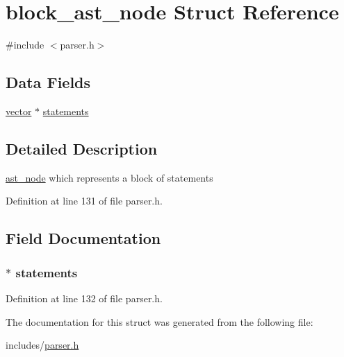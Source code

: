 \hypertarget{structblock__ast__node}{\section{block\+\_\+ast\+\_\+node Struct Reference}
\label{structblock__ast__node}
}


{\ttfamily \#include $<$parser.\+h$>$}

\subsection*{Data Fields}
\begin{DoxyCompactItemize}
\item 
\hyperlink{structvector}{vector} $\ast$ \hyperlink{structblock__ast__node_aa5ede4d66d6c38056a1f1474cef5c482}{statements}
\end{DoxyCompactItemize}


\subsection{Detailed Description}
\hyperlink{structast__node}{ast\+\_\+node} which represents a block of statements 

Definition at line 131 of file parser.\+h.



\subsection{Field Documentation}
\hypertarget{structblock__ast__node_aa5ede4d66d6c38056a1f1474cef5c482}{
\subsubsection[{statements}]{$\ast$ statements}}\label{structblock__ast__node_aa5ede4d66d6c38056a1f1474cef5c482}


Definition at line 132 of file parser.\+h.



The documentation for this struct was generated from the following file\+:\begin{DoxyCompactItemize}
\item 
includes/\hyperlink{parser_8h}{parser.\+h}\end{DoxyCompactItemize}
